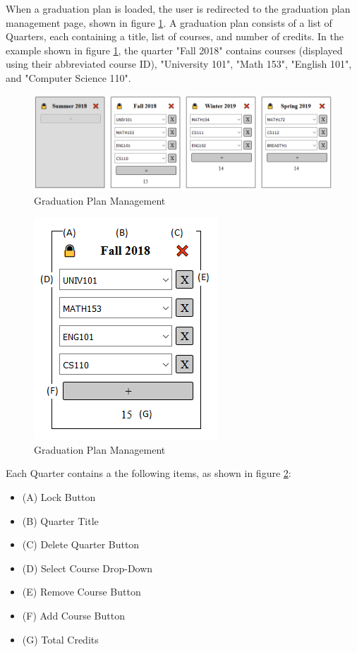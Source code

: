 \documentclass[]{article}
\begin{document}
		When a graduation plan is loaded, the user is redirected to the graduation plan management page, shown in figure \ref{planmanagement}. A graduation plan consists of a list of Quarters, each containing a title, list of courses, and number of credits. In the example shown in figure \ref{planmanagement}, the quarter "Fall 2018" contains courses (displayed using their abbreviated course ID), "University 101", "Math 153", "English 101", and "Computer Science 110". 
		\begin{figure}[H]
			\caption{Graduation Plan Management}
			\label{planmanagement}
			\centering
			\includegraphics[width=\textwidth]{planmanagement.PNG}
		\end{figure}
		\begin{figure}[H]
			\caption{Graduation Plan Management}
			\label{quarter}
			\centering
			\includegraphics{quarter.PNG}
		\end{figure}
		Each Quarter contains a the following items, as shown in figure \ref{quarter}:
		\begin{itemize}
			\item (A) Lock Button
			\item (B) Quarter Title
			\item (C) Delete Quarter Button
			\item (D) Select Course Drop-Down
			\item (E) Remove Course Button
			\item (F) Add Course Button
			\item (G) Total Credits
		\end{itemize}
		
\end{document}

